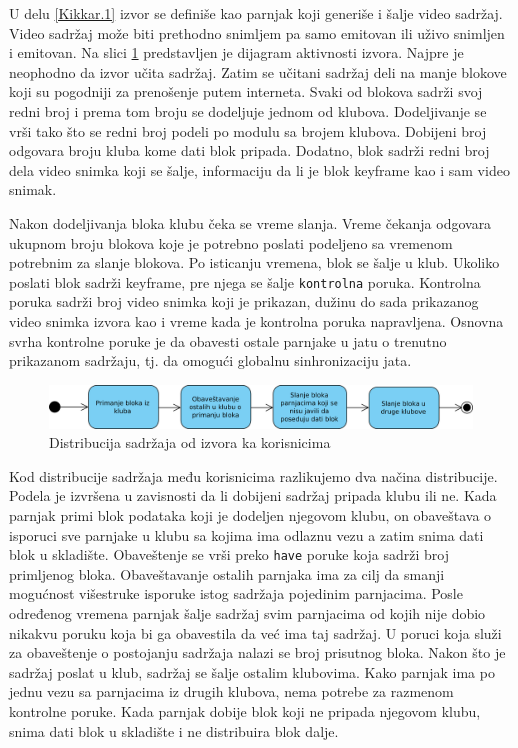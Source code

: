 \documentclass[12pt,oneside]{memoir}
\begin{document}
U delu \ref{Kikkar.1} izvor se definiše kao parnjak koji generiše i šalje video sadržaj. Video sadržaj može biti prethodno snimljem pa samo emitovan ili uživo snimljen i emitovan. Na slici \ref{fig:distribucija-izvor} predstavljen je dijagram aktivnosti izvora. Najpre je neophodno da izvor učita sadržaj. Zatim se učitani sadržaj deli na manje blokove koji su pogodniji za prenošenje putem interneta. Svaki od blokova sadrži svoj redni broj i prema tom broju se dodeljuje jednom od klubova. Dodeljivanje se vrši tako što se redni broj podeli po modulu sa brojem klubova. Dobijeni broj odgovara broju kluba kome dati blok pripada. Dodatno, blok sadrži redni broj dela video snimka koji se šalje, informaciju da li je blok keyframe kao i sam video snimak.

Nakon dodeljivanja bloka klubu čeka se vreme slanja. Vreme čekanja odgovara ukupnom broju blokova koje je potrebno poslati podeljeno sa vremenom potrebnim za slanje blokova. Po isticanju vremena, blok se šalje u klub. Ukoliko poslati blok sadrži keyframe, pre njega se šalje \texttt{kontrolna} poruka. Kontrolna poruka sadrži broj video snimka koji je prikazan, dužinu do sada prikazanog video snimka izvora kao i vreme kada je kontrolna poruka napravljena. Osnovna svrha kontrolne poruke je da obavesti ostale parnjake u jatu o trenutno prikazanom sadržaju, tj. da omogući globalnu sinhronizaciju jata. 


\begin{figure}[!ht]
  \centering
  \includegraphics[width=1.05\textwidth]{slike/distribucija-jato.jpg}
  \caption{Distribucija sadržaja od izvora ka korisnicima}
  \label{fig:distribucija-izvor}
\end{figure}
\par

Kod distribucije sadržaja među korisnicima razlikujemo dva načina distribucije. Podela je izvršena u zavisnosti da li dobijeni sadržaj pripada klubu ili ne. Kada parnjak primi blok podataka koji je dodeljen njegovom klubu, on obaveštava o isporuci sve parnjake u klubu sa kojima ima odlaznu vezu a zatim snima dati blok u skladište. Obaveštenje se vrši preko \texttt{have} poruke koja sadrži broj primljenog bloka. Obaveštavanje ostalih parnjaka ima za cilj da smanji mogućnost višestruke isporuke istog sadržaja pojedinim parnjacima. Posle određenog vremena parnjak šalje sadržaj svim parnjacima od kojih nije dobio nikakvu poruku koja bi ga obavestila da već ima taj sadržaj. U poruci koja služi za obaveštenje o postojanju sadržaja nalazi se broj prisutnog bloka. Nakon što je sadržaj poslat u klub, sadržaj se šalje ostalim klubovima. Kako parnjak ima po jednu vezu sa parnjacima iz drugih klubova, nema potrebe za razmenom kontrolne poruke. Kada parnjak dobije blok koji ne pripada njegovom klubu, snima dati blok u skladište i ne distribuira blok dalje. 
\end{document}
